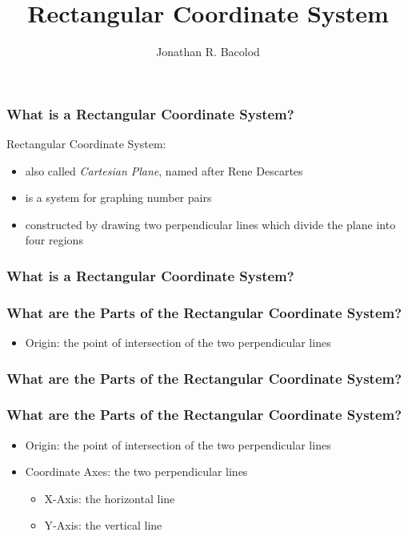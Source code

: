 \documentclass[14pt]{beamer}
\title[] {Rectangular Coordinate System}
\author{Jonathan R. Bacolod}
\institute[SHS]{Sauyo High School}
\date{}
\begin{document}
	\frame{\titlepage}
	
	\begin{frame}
		\frametitle{What is a Rectangular Coordinate System?}
		Rectangular Coordinate System:
		\begin{itemize}
			\item<2-> also called \textit{Cartesian Plane}, named after Rene Descartes
			\item<3-> is a system for graphing number pairs
			\item<4-> constructed by drawing two perpendicular lines which divide the plane into four regions
		\end{itemize}
	\end{frame}

     \begin{frame}
     	\frametitle{What is a Rectangular Coordinate System?}
     \end{frame}

    \begin{frame}
    	\frametitle{What are the Parts of the Rectangular Coordinate System?}
    	\begin{itemize}
    		\item Origin:  the point of intersection of the two perpendicular lines
    	\end{itemize}
    \end{frame}

    \begin{frame}
    	\frametitle{What are the Parts of the Rectangular Coordinate System?}
    	
    	\pause {}
    \end{frame}

     \begin{frame}
    	\frametitle{What are the Parts of the Rectangular Coordinate System?}
    	\begin{itemize}
    		\item Origin:  the point of intersection of the two perpendicular lines
    		\item Coordinate Axes: the two perpendicular lines
    		\begin{itemize}
    			\item<2-> X-Axis: the horizontal line
    			\item<3-> Y-Axis: the vertical line
    		\end{itemize}
    	\end{itemize}
    \end{frame}
    
\end{document}
